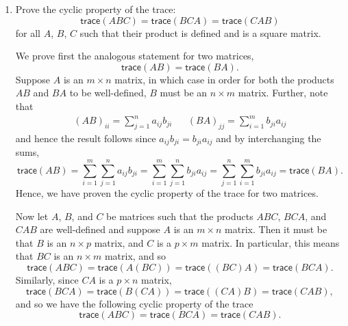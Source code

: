 \documentclass{../../../kin_math}
\begin{document}
\begin{questions}
  \question
  \begin{enumerate}
    \item Prove the cyclic property of the trace:
    \begin{equation}
      \textsf{trace}(ABC) = \textsf{trace}(BCA) = \textsf{trace}(CAB)
    \end{equation}
    for all $A$, $B$, $C$ such that their product is defined and is a square matrix.
    \begin{solution}
      We prove first the analogous statement for two matrices,
      \begin{equation*}
        \textsf{trace}(AB) = \textsf{trace}(BA).
      \end{equation*}
      Suppose $A$ is an $m \times n$ matrix, in which case in order for both the products $AB$ and $BA$ to be well-defined, $B$ must be an $n \times m$ matrix. Further, note that
      \begin{align*}
        (AB)_{ii} = \sum_{j = 1}^n a_{ij} b_{ji} && (BA)_{jj} = \sum_{i = 1}^m b_{ji} a_{ij}
      \end{align*}
      and hence the result follows since $a_{ij} b_{ji} = b_{ji} a_{ij}$ and by interchanging the sums,
      \begin{equation*}
        \textsf{trace}(AB) = \sum_{i = 1}^m \sum_{j = 1}^n a_{ij} b_{ji} = \sum_{i = 1}^m \sum_{j = 1}^n b_{ji} a_{ij} = \sum_{j = 1}^n \sum_{i = 1}^m b_{ji} a_{ij} = \textsf{trace}(BA).
      \end{equation*}
      Hence, we have proven the cyclic property of the trace for two matrices.

      Now let $A$, $B$, and $C$ be matrices such that the products $ABC$, $BCA$, and $CAB$ are well-defined and suppose $A$ is an $m \times n$ matrix. Then it must be that $B$ is an $n \times p$ matrix, and $C$ is a $p \times m$ matrix. In particular, this means that $BC$ is an $n \times m$ matrix, and so
      \begin{equation*}
        \textsf{trace}(ABC) = \textsf{trace}(A(BC)) = \textsf{trace}((BC)A) = \textsf{trace}(BCA).
      \end{equation*}
      Similarly, since $CA$ is a $p \times n$ matrix,
      \begin{equation*}
        \textsf{trace}(BCA) = \textsf{trace}(B(CA)) = \textsf{trace}((CA)B) = \textsf{trace}(CAB),
      \end{equation*}
      and so we have the following cyclic property of the trace
      \begin{equation*}
        \textsf{trace}(ABC) = \textsf{trace}(BCA) = \textsf{trace}(CAB).
      \end{equation*}
    \end{solution}


\end{enumerate}
\end{questions}
\end{document}

